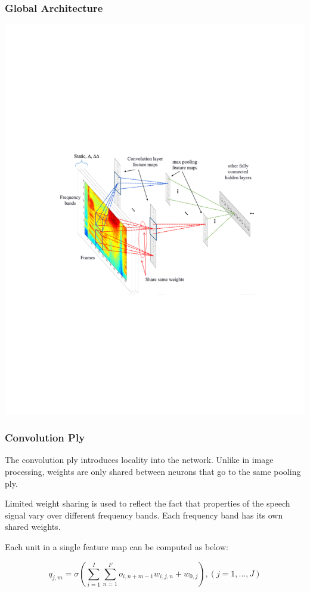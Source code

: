 \documentclass[notes]{beamer}
\begin{document}
\begin{frame}
	\frametitle{Global Architecture}
	\includegraphics[scale=0.65, trim=2cm 0 0 8cm, clip=true]{cnn-global.pdf}
\end{frame}

\begin{frame}
	\frametitle{Convolution Ply}
	\begin{center}
		The convolution ply introduces locality into the network. Unlike in image processing, weights are only shared between neurons that go to the same pooling ply. 
	\end{center}
	
	\begin{center}
		Limited weight sharing is used to reflect the fact that properties of the speech signal vary over different frequency bands. Each frequency band has its own shared weights.
	\end{center}	
	\vfill
	\begin{center}
		Each unit in a single feature map can be computed as below:
	\end{center}
	\begin{equation*}
	q_{j,m} = \sigma(\sum_{i=1}^{I}\sum_{n=1}^{F}o_{i,n+m-1}w_{i,j,n}+w_{0,j}), (j = 1, ..., J)
	\end{equation*}

\end{frame}
\end{document}
